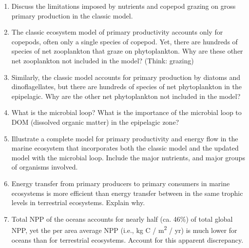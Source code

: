\documentclass[nofonts, letterpaper]{tufte-handout}
\begin{document}
\begin{enumerate}
\item
  Discuss the limitations imposed by nutrients and copepod grazing on
  gross primary production in the classic model.
  
\item
  The classic ecosystem model of primary productivity accounts only for
  copepods, often only a single species of copepod. Yet, there are
  hundreds of species of net zooplankton that graze on phytoplankton. Why
  are these other net zooplankton not included in the model? (Think: grazing)

\item
  Similarly, the classic model accounts for primary production by
  diatoms and dinoflagellates, but there are hundreds of species of net
  phytoplankton in the epipelagic. Why are the other net phytoplankton
  not included in the model?
  
\item
  What is the microbial loop? What is the importance of the microbial
  loop to DOM (dissolved organic matter) in the epipelagic zone?
  
\item
  Illustrate a complete model for primary productivity and energy flow
  in the marine ecosystem that incorporates both the classic model and
  the updated model with the microbial loop. Include the major
  nutrients, and major groups of organisms involved.
  
\item
  Energy transfer from primary producers to primary consumers in marine
  ecosystems is more efficient than energy transfer between in the same
  trophic levels in terrestrial ecosystems. Explain why.
  
\item
  Total NPP of the oceans accounts for nearly half (ca. 46\%) of total
  global NPP, yet the per area average NPP (i.e., kg C /
  m\textsuperscript{2} / yr) is much lower for oceans than for
  terrestrial ecosystems. Account for this apparent discrepancy.
 
 \end{enumerate}
\end{document}
